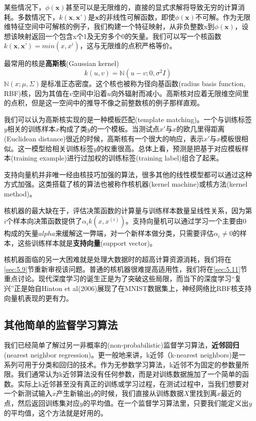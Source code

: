 某些情况下，$\phi(\textbf{x})$甚至可以是无限维的，直接的显式求解将导致无穷的计算消耗。多数情况下，$k(\textbf{x}, \textbf{x'})$是$\textbf{x}$的非线性可解函数，即使$\phi(\textbf{x})$不可解。作为无限维特征空间中可解核的例子，我们构建一个特征映射，从非负整数x到$\phi(\textbf{x})$，设想该映射返回一个包含x个1及无穷多个0的矢量。我们可以写一个核函数$k(\textbf{x}, \textbf{x'}) = min(x, x^{i})$，这与无限维的点积严格等价。

最常用的核是\textbf{高斯核}(Gaussian kernel)
\begin{equation}
	k(u, v) = \mathbb{N}(u-v;0, \sigma^{2}I)
\end{equation}
$\mathbb{N}(x;\mu,\Sigma)$是标准正态密度。这个核也被称为径向基函数(radius basis function, RBF)核，因为其值在$v$空间中沿着$u$向外辐射而减小。高斯核对应着无限维空间里的点积，但是这一空间中的推导不像之前整数核的例子那样直观。

我们可以认为高斯核实现的是一种模板匹配(template matching)。一个与训练标签$y$相关的训练样本$x$构成了类$y$的一个模板。当测试点$x'$与$x$的欧几里得距离(Euclidean distance)很近的时候，高斯核有一个很大的响应，表示$x'$与$x$模板很相似。这一模型给相关训练标签$y$的权重很高。总体上看，预测是把基于对应模板样本(training example)进行过加权的训练标签(training label)组合了起来。

支持向量机并非唯一经由核技巧加强的算法，很多其他的线性模型都可以通过这种方式加强。这类搭载了核的算法也被称作核机器(kernel machine)或核方法(kernel method)。

核机器的最大缺在于，评估决策函数的计算量与训练样本数量呈线性关系，因为第$i$个样本向决策函数提供了$\alpha_{i}k(x,x^{(i)})$。支持向量机可以通过学习一个主要由0构成的矢量$alpha$来缓解这一弊端，对一个新样本做分类，只需要评估$\alpha_{i}\neq0$的样本，这些训练样本就是\textbf{支持向量}(support vector)。

核机器面临的另一大困难就是处理大数据时的超高计算资源消耗，我们将在\ref{sec:5.9}节重新审视该问题。普通的核机器很难提高适用性，我们将在\ref{sec:5.11}节重点讨论。现代深度学习的诞生正是为了突破这些局限，而当下的深度学习“复兴”正是始自Hinton et al(2006)展现了在MNIST数据集上，神经网络比RBF核支持向量机表现的更有力。

\subsection{其他简单的监督学习算法}
\label{sec:5.7.3}

我们已经简单了解过另一非概率的(non-probabilistic)监督学习算法，\textbf{近邻回归}(nearest neighbor regression)。更一般地来讲，k近邻（k-nearest neighbors)是一系列可用于分类和回归的技术。作为无参数学习算法，k近邻不为固定的参数量所限。我们通常认为k近邻算法没有任何参数，而是对训练数据施加了一个简单的函数。实际上k近邻甚至没有真正的训练或学习过程，在测试过程中，当我们想要对一个新测试输入$x$产生新输出$y$的时候，我们直接从训练数据$X$里找到离$x$最近的点，然后返回训练集对应$y$的平均值。在一个监督学习算法里，只要我们能定义出$y$的平均值，这个方法就是好用的。

